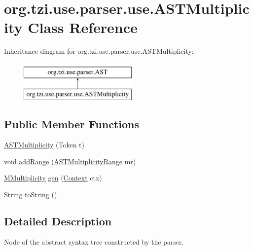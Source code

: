 \hypertarget{classorg_1_1tzi_1_1use_1_1parser_1_1use_1_1_a_s_t_multiplicity}{\section{org.\-tzi.\-use.\-parser.\-use.\-A\-S\-T\-Multiplicity Class Reference}
\label{classorg_1_1tzi_1_1use_1_1parser_1_1use_1_1_a_s_t_multiplicity}
}
Inheritance diagram for org.\-tzi.\-use.\-parser.\-use.\-A\-S\-T\-Multiplicity\-:\begin{figure}[H]
\begin{center}
\leavevmode
\includegraphics[height=2.000000cm]{classorg_1_1tzi_1_1use_1_1parser_1_1use_1_1_a_s_t_multiplicity}
\end{center}
\end{figure}
\subsection*{Public Member Functions}
\begin{DoxyCompactItemize}
\item 
\hyperlink{classorg_1_1tzi_1_1use_1_1parser_1_1use_1_1_a_s_t_multiplicity_a9d8965f110d8ffa603bad8cdf351591b}{A\-S\-T\-Multiplicity} (Token t)
\item 
void \hyperlink{classorg_1_1tzi_1_1use_1_1parser_1_1use_1_1_a_s_t_multiplicity_ae893ccf2f2a6c3fe3904f37eb9b5ce09}{add\-Range} (\hyperlink{classorg_1_1tzi_1_1use_1_1parser_1_1use_1_1_a_s_t_multiplicity_range}{A\-S\-T\-Multiplicity\-Range} mr)
\item 
\hyperlink{classorg_1_1tzi_1_1use_1_1uml_1_1mm_1_1_m_multiplicity}{M\-Multiplicity} \hyperlink{classorg_1_1tzi_1_1use_1_1parser_1_1use_1_1_a_s_t_multiplicity_a8ca79b62ac51ef15c91bf99c7ab8ae65}{gen} (\hyperlink{classorg_1_1tzi_1_1use_1_1parser_1_1_context}{Context} ctx)
\item 
String \hyperlink{classorg_1_1tzi_1_1use_1_1parser_1_1use_1_1_a_s_t_multiplicity_ad9c24873a1ab8ca3277cfef25b2dec0c}{to\-String} ()
\end{DoxyCompactItemize}


\subsection{Detailed Description}
Node of the abstract syntax tree constructed by the parser.

